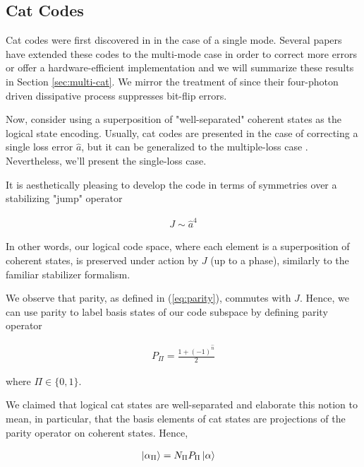 \documentclass[12]{amsart}
\newcommand\0{\mathbf{0}}
\newcommand\<{\langle}
\renewcommand\>{\rangle}
\begin{document}
\subsection{Cat Codes}

Cat codes were first discovered in \cite{cochrane1999macroscopically} in the case of a single mode. Several papers have extended these codes to the multi-mode case in order to correct more errors or offer a hardware-efficient implementation \cite{albert2018multimode, leghtas2013hardware, mirrahimi2014dynamically} and we will summarize these results in Section \ref{sec:multi-cat}. We mirror the treatment of \cite{mirrahimi2014dynamically} since their four-photon driven dissipative process suppresses bit-flip errors.

Now, consider using a superposition of "well-separated" coherent states as the logical state encoding. Usually, cat codes are presented in the case of correcting a single loss error $\hat{a}$, but it can be generalized to the multiple-loss case \cite{albert2018multimode}. Nevertheless, we'll present the single-loss case.

It is aesthetically pleasing to develop the code in terms of symmetries over a stabilizing "jump" operator 

\begin{align}
\label{eq:single-jump}
J \sim \hat{a}^4	
\end{align}

In other words, our logical code space, where each element is a superposition of coherent states, is preserved under action by $J$ (up to a phase), similarly to the familiar stabilizer formalism.

We observe that parity, as defined in (\ref{eq:parity}), commutes with $J$. Hence, we can use parity to label basis states of our code subspace by defining parity operator

\begin{align*}
P_{\Pi} = \frac{1+(-1)^{\hat{n}}}{2}	
\end{align*}

where $\Pi \in \{0, 1\}$.

We claimed that logical cat states are well-separated and elaborate this notion to mean, in particular, that the basis elements of cat states are projections of the parity operator on coherent states. Hence,

\begin{align*}
\ket{\alpha_\Pi} &= N_\Pi P_\Pi \ket{\alpha}
\end{align*}
\end{document}
